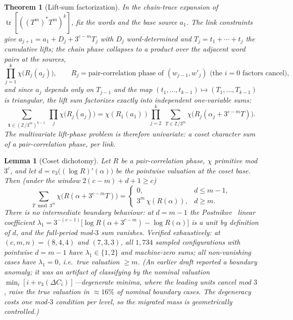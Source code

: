 \documentclass[11pt]{article}
\newcommand{\Z}{\mathbb{Z}}
\theoremstyle{plain}
\newtheorem{theorem}{Theorem}
\newtheorem{lemma}{Lemma}
\theoremstyle{definition}
\theoremstyle{remark}
\begin{document}
\begin{theorem}[Lift-sum factorization]\label{thm:liftfact}
In the chain-trace expansion of $\operatorname{tr}[((T^m)^*T^m)^k]$, fix the
words and the base source $a_1$. The link constraints give
$a_{j+1}=a_1+D_j+3^{c-m}T_j$ with $D_j$ word-determined and
$T_j=t_1+\cdots+t_j$ the cumulative lifts; the chain phase collapses to a
product over the \emph{adjacent} word pairs at the sources,
\[
\prod_{j=1}^{k}\chi\bigl(R_j(a_j)\bigr),
\qquad
R_j=\text{pair-correlation phase of }(w_{j-1},w'_j)
\text{ (the $i{=}0$ factors cancel),}
\]
and since $a_j$ depends only on $T_{j-1}$ and the map
$(t_1,\dots,t_{k-1})\mapsto(T_1,\dots,T_{k-1})$ is triangular, the lift sum
factorizes \emph{exactly} into independent one-variable sums:
\[
\sum_{\mathbf t\in(\Z/3^m)^{k-1}}\ \prod_{j}\chi\bigl(R_j(a_j)\bigr)
=\chi(R_1(a_1))\prod_{j=2}^{k}\ \sum_{T\in\Z/3^m}
\chi\bigl(R_j(\alpha_j+3^{c-m}T)\bigr).
\]
The multivariate lift-phase problem is therefore \emph{univariate}: a coset
character sum of a pair-correlation phase, per link.
\end{theorem}

\begin{lemma}[Coset dichotomy]\label{lem:coset}
Let $R$ be a pair-correlation phase, $\chi$ primitive mod $3^c$, and let
$d=v_3\bigl((\log R)'(\alpha)\bigr)$ be the \emph{pointwise} valuation at the
coset base. Then (under the window $2(c-m)+d+1\ge c$)
\[
\sum_{T\bmod 3^m}\chi\bigl(R(\alpha+3^{c-m}T)\bigr)=
\begin{cases}
0, & d\le m-1,\\
3^m\,\chi(R(\alpha)), & d\ge m .
\end{cases}
\]
There is no intermediate boundary behaviour: at $d=m-1$ the
Postnikov~\cite{postnikov1955} linear
coefficient $\lambda_1=3^{-(c-1)}\bigl[\log R(\alpha+3^{c-m})-\log
R(\alpha)\bigr]$ is a unit by definition of $d$, and the full-period mod-$3$
sum vanishes. Verified exhaustively: at $(c,m,n)=(8,4,4)$ and $(7,3,3)$, all
$1{,}734$ sampled configurations with pointwise $d=m-1$ have
$\lambda_1\in\{1,2\}$ and machine-zero sums; all non-vanishing cases have
$\lambda_1=0$, i.e.\ true valuation $\ge m$. (An earlier draft reported a
boundary anomaly; it was an artifact of classifying by the \emph{nominal}
valuation $\min_i[i+v_3(\Delta C_i)]$---degenerate minima, where the leading
units cancel mod $3$, raise the true valuation in $\approx16\%$ of nominal
boundary cases. The degeneracy costs one mod-$3$ condition per level, so the
migrated mass is geometrically controlled.)
\end{lemma}
\end{document}
